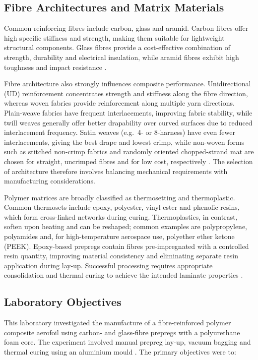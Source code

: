 \documentclass[11pt,a4paper]{article}
\newcommand{\added}[1]{\textcolor{addgreen}{#1}}
\newcommand{\added}[1]{#1}
\begin{document}
\subsection{Fibre Architectures and Matrix Materials}

Common reinforcing fibres include carbon, glass and aramid. Carbon
fibres offer high specific stiffness and strength, making them
suitable for lightweight structural components. Glass fibres
provide a cost-effective combination of strength, durability and
electrical insulation, while aramid fibres exhibit high toughness
and impact resistance \citep{mallick2007}.

Fibre architecture also strongly influences composite performance.
Unidirectional (UD) reinforcement concentrates strength and
stiffness along the fibre direction, whereas woven fabrics provide
reinforcement along multiple yarn directions. Plain-weave fabrics
have frequent interlacements, improving fabric stability, while
twill weaves generally offer better drapability over curved
surfaces due to reduced interlacement frequency.
\added{Satin weaves (e.g.\ 4- or 8-harness) have even fewer
interlacements, giving the best drape and lowest crimp, while
non-woven forms such as stitched non-crimp fabrics and randomly
oriented chopped-strand mat are chosen for straight, uncrimped fibres
and for low cost, respectively \citep{mallick2007,campbell2004}.} The selection
of architecture therefore involves balancing mechanical
requirements with manufacturing considerations.

Polymer matrices are broadly classified as thermosetting and
thermoplastic. Common thermosets include epoxy, polyester\added{, vinyl
ester} and phenolic resins, which form cross-linked networks during curing.
Thermoplastics, in contrast, soften upon heating and can be
reshaped\added{; common examples are polypropylene, polyamides and,
for high-temperature aerospace use, polyether ether ketone (PEEK)}. Epoxy-based prepregs contain fibres pre-impregnated
with a controlled resin quantity, improving material consistency
and eliminating separate resin application during lay-up.
Successful processing requires appropriate consolidation and
thermal curing to achieve the intended laminate properties
\citep{mallick2007,wu2026}.


\subsection{Laboratory Objectives}

This laboratory investigated the manufacture of a fibre-reinforced
polymer composite aerofoil using carbon- and glass-fibre prepregs
with a polyurethane foam core. The experiment involved manual
prepreg lay-up, vacuum bagging and thermal curing using an
aluminium mould \citep{chang2026}. The primary objectives were to:
\end{document}
